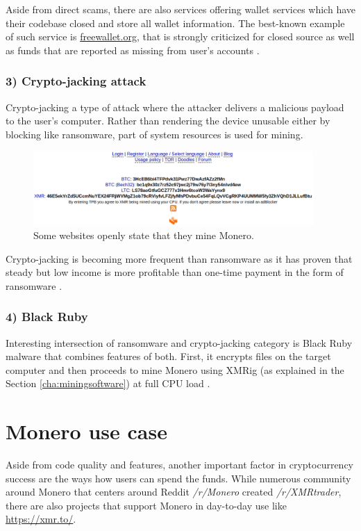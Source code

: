 \documentclass[
  printed, %
  table,   %
  lof,     %
  lot,     %
           oneside, color
]{fithesis3}
\begin{document}
Aside from direct scams, there are also services offering wallet services which have their codebase closed and store all wallet information. The best-known example of such service is \url{freewallet.org}, that is strongly criticized for closed source as well as funds that are reported as missing from user's accounts \cite{wijayamonero}.
\subsubsection{3) Crypto-jacking attack}
\label{cha:cryptojacking} 
Crypto-jacking a type of attack where the attacker delivers a malicious payload to the user's computer. Rather than rendering the device unusable either by blocking like ransomware, part of system resources is used for mining.

\begin{figure}[H]
\begin{center}

 \includegraphics[trim={0 0 0 0},clip,width=0.95\textwidth]{cryptojacking.png}
    \caption{Some websites openly state that they mine Monero.}
    \label{pic:monerokirk}
\end{center}
    \end{figure}

Crypto-jacking is becoming more frequent than ransomware as it has proven that steady but low income is more profitable than one-time payment in the form of ransomware \cite{higbee2018role}.

\subsubsection{4) Black Ruby}
Interesting intersection of ransomware and crypto-jacking category is Black Ruby malware that combines features of both. First, it encrypts files on the target computer and then proceeds to mine Monero using XMRig (as explained in the Section \ref{cha:miningsoftware}) at full CPU load \cite{blackruby2018}.

\vspace{-1em}
\section{Monero use case}
Aside from code quality and features, another important factor in cryptocurrency success are the ways how users can spend the funds. While numerous community around Monero that centers around Reddit \textit{/r/Monero} created \textit{/r/XMRtrader}, there are also projects that support Monero in day-to-day use like \url{https://xmr.to/}.
\end{document}
